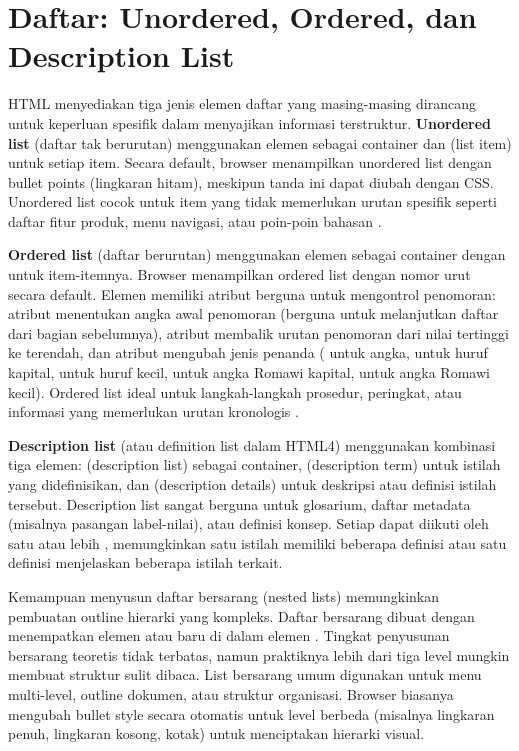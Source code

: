 \section{Daftar: Unordered, Ordered, dan Description List}

HTML menyediakan tiga jenis elemen daftar yang masing-masing dirancang untuk keperluan spesifik dalam menyajikan informasi terstruktur. \textbf{Unordered list} (daftar tak berurutan) menggunakan elemen  sebagai container dan  (list item) untuk setiap item. Secara default, browser menampilkan unordered list dengan bullet points (lingkaran hitam), meskipun tanda ini dapat diubah dengan CSS. Unordered list cocok untuk item yang tidak memerlukan urutan spesifik seperti daftar fitur produk, menu navigasi, atau poin-poin bahasan \cite{mdnHtmlIntro}.

\textbf{Ordered list} (daftar berurutan) menggunakan elemen  sebagai container dengan  untuk item-itemnya. Browser menampilkan ordered list dengan nomor urut secara default. Elemen  memiliki atribut berguna untuk mengontrol penomoran: atribut  menentukan angka awal penomoran (berguna untuk melanjutkan daftar dari bagian sebelumnya), atribut  membalik urutan penomoran dari nilai tertinggi ke terendah, dan atribut  mengubah jenis penanda ( untuk angka,  untuk huruf kapital,  untuk huruf kecil,  untuk angka Romawi kapital,  untuk angka Romawi kecil). Ordered list ideal untuk langkah-langkah prosedur, peringkat, atau informasi yang memerlukan urutan kronologis \cite{webdevHtml}.

\textbf{Description list} (atau definition list dalam HTML4) menggunakan kombinasi tiga elemen:  (description list) sebagai container,  (description term) untuk istilah yang didefinisikan, dan  (description details) untuk deskripsi atau definisi istilah tersebut. Description list sangat berguna untuk glosarium, daftar metadata (misalnya pasangan label-nilai), atau definisi konsep. Setiap  dapat diikuti oleh satu atau lebih , memungkinkan satu istilah memiliki beberapa definisi atau satu definisi menjelaskan beberapa istilah terkait.

Kemampuan menyusun daftar bersarang (nested lists) memungkinkan pembuatan outline hierarki yang kompleks. Daftar bersarang dibuat dengan menempatkan elemen  atau  baru di dalam elemen . Tingkat penyusunan bersarang teoretis tidak terbatas, namun praktiknya lebih dari tiga level mungkin membuat struktur sulit dibaca. List bersarang umum digunakan untuk menu multi-level, outline dokumen, atau struktur organisasi. Browser biasanya mengubah bullet style secara otomatis untuk level berbeda (misalnya lingkaran penuh, lingkaran kosong, kotak) untuk menciptakan hierarki visual.

